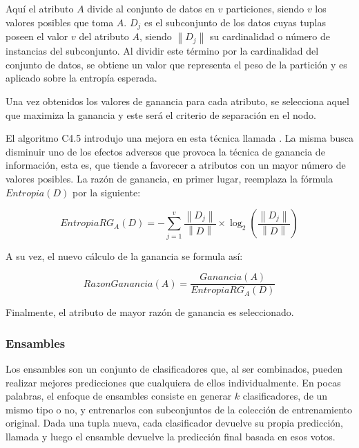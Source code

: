 Aquí el atributo $A$ divide al conjunto de datos en $v$ particiones, siendo $v$
los valores posibles que toma $A$. $D_{j}$ es el subconjunto de los datos cuyas
tuplas poseen el valor $v$ del atributo $A$, siendo $\left\|D_{j}\right\|$ su
cardinalidad o número de instancias del subconjunto. Al dividir este término por
la cardinalidad del conjunto de datos, se obtiene un valor que representa el
peso de la partición y es aplicado sobre la entropía esperada.

Una vez obtenidos los valores de ganancia para cada atributo, se selecciona
aquel que maximiza la ganancia y este será el criterio de separación en el nodo.

El algoritmo C4.5 introdujo una mejora en esta técnica llamada . La misma busca disminuir uno de los efectos adversos que provoca
la técnica de ganancia de información, esta es, que tiende a favorecer a
atributos con un mayor número de valores posibles. La razón de ganancia, en
primer lugar, reemplaza la fórmula $Entropia(D)$ por la siguiente:

\begin{equation}
   EntropiaRG_{A}(D) = - \sum_{j=1}^{v} \frac{\left\| D_{j} \right\|}{\left\| D \right\|} 
   \times \log_{2}(\frac{\left\| D_{j} \right\|}{\left\| D \right\|})
\end{equation}

A su vez, el nuevo cálculo de la ganancia se formula así:

\begin{equation} \label{eq:gan_c45}
   RazonGanancia(A) = \frac{Ganancia(A)}{EntropiaRG_{A}(D)} 
\end{equation}

Finalmente, el atributo de mayor razón de ganancia es seleccionado.




\subsubsection{Ensambles}

Los ensambles son un conjunto de clasificadores que, al ser combinados, pueden
realizar mejores predicciones que cualquiera de ellos individualmente. En pocas
palabras, el enfoque de ensambles consiste en generar $k$ clasificadores, de un
mismo tipo o no, y entrenarlos con subconjuntos de la colección de entrenamiento
original. Dada una tupla nueva, cada clasificador devuelve su propia predicción,
llamada  y luego el ensamble devuelve la predicción final basada
en esos votos.

